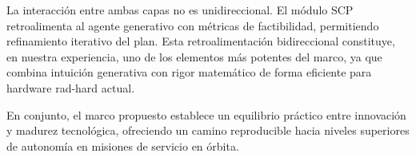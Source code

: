 La interacción entre ambas capas no es unidireccional. El módulo SCP retroalimenta al agente generativo con métricas de factibilidad, permitiendo refinamiento iterativo del plan. Esta retroalimentación bidireccional constituye, en nuestra experiencia, uno de los elementos más potentes del marco, ya que combina intuición generativa con rigor matemático de forma eficiente para hardware rad-hard actual.

En conjunto, el marco propuesto establece un equilibrio práctico entre innovación y madurez tecnológica, ofreciendo un camino reproducible hacia niveles superiores de autonomía en misiones de servicio en órbita.